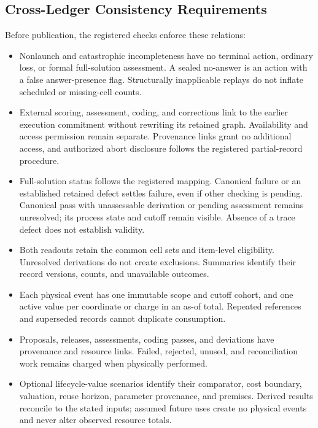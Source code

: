 \documentclass[10pt]{article} %
\providecommand{\1}{\mathbf{1}}  %
\theoremstyle{remark}
\theoremstyle{definition}
\begin{document}
\subsection{Cross-Ledger Consistency Requirements}
\label{subsec:ledger-consistency}

Before publication, the registered checks enforce these relations:
\begin{itemize}[leftmargin=*,itemsep=4pt,topsep=4pt]
\item Nonlaunch and catastrophic incompleteness have no terminal action,
ordinary loss, or formal full-solution assessment. A sealed no-answer is an
action with a false answer-presence flag. Structurally inapplicable replays do not
inflate scheduled or missing-cell counts.
\item External scoring, assessment, coding, and corrections link to the
earlier execution commitment without rewriting its retained graph.
Availability and access permission remain separate. Provenance links
grant no additional access, and authorized abort disclosure follows
the registered partial-record procedure.
\item Full-solution status follows the registered mapping. Canonical
failure or an established retained defect settles failure, even if other
checking is pending. Canonical pass with unassessable derivation or pending
assessment remains unresolved; its process state and cutoff remain visible.
Absence of a trace defect does not establish validity.
\item Both readouts retain the common cell sets and item-level eligibility.
Unresolved derivations do not create exclusions. Summaries identify their
record versions, counts, and unavailable outcomes.
\item Each physical event has one immutable scope and cutoff cohort,
and one active value per coordinate or charge in an as-of total.
Repeated references and superseded records cannot duplicate consumption.
\item Proposals, releases, assessments, coding passes, and deviations
have provenance and resource links. Failed, rejected, unused, and
reconciliation work remains charged when physically performed.

\item Optional lifecycle-value scenarios identify their comparator,
cost boundary, valuation, reuse horizon, parameter provenance, and
premises. Derived results reconcile to the stated inputs; assumed
future uses create no physical events and never alter observed
resource totals.
\end{itemize}
\end{document}
